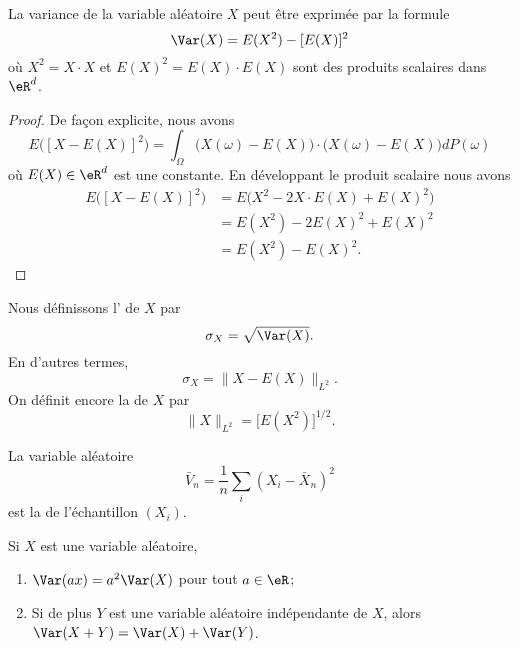 \begin{proposition}     \label{PrropVarAlterfrom}
	La variance de la variable aléatoire \( X\) peut être exprimée par la formule
	\begin{equation}        \label{EqtWqMGB}
		\Var(X)=E(X^2)-[E(X)]^2
	\end{equation}
	où \( X^2=X\cdot X\) et \( E(X)^2=E(X)\cdot E(X)\) sont des produits scalaires dans \( \eR^d\).
\end{proposition}

\begin{proof}
	De façon explicite, nous avons
	\begin{equation}
		E\big( [X-E(X)]^2 \big)=\int_{\Omega}\big( X(\omega)-E(X) \big)\cdot\big( X(\omega)-E(X) \big)dP(\omega)
	\end{equation}
	où \( E(X)\in\eR^d\) est une constante. En développant le produit scalaire nous avons
	\begin{subequations}
		\begin{align}
			E\big( [X-E(X)]^2 \big) & =E\big( X^2-2X\cdot E(X)+E(X)^2 \big) \\
			                        & =E(X^2)-2E(X)^2+E(X)^2                \\
			                        & =E(X^2)-E(X)^2.
		\end{align}
	\end{subequations}
\end{proof}


Nous définissons l' de \( X\) par
\begin{equation}
	\sigma_X=\sqrt{\Var(X)}.
\end{equation}
En d'autres termes,
\begin{equation}
	\sigma_X=\| X-E(X) \|_{L^2}.
\end{equation}
On définit encore la  de \( X\) par
\begin{equation}
	\| X \|_{L^2}=\big[ E(X^2) \big]^{1/2}.
\end{equation}

La variable aléatoire
\begin{equation}
	\bar V_n=\frac{1}{ n }\sum_i(X_i-\bar X_n)^2
\end{equation}
est la  de l'échantillon \( (X_i)\).

\begin{lemma}       \label{LemEXYEXEYindep}\label{PropVarPropnnlin}
	Si \( X\) est une variable aléatoire,
	\begin{enumerate}
		\item
		      \( \Var(ax)=a^2\Var(X)\) pour tout \( a\in\eR\);
		\item
		      Si de plus \( Y\) est une variable aléatoire indépendante de \( X\), alors \( \Var(X+Y)=\Var(X)+\Var(Y)\).
	\end{enumerate}
\end{lemma}

